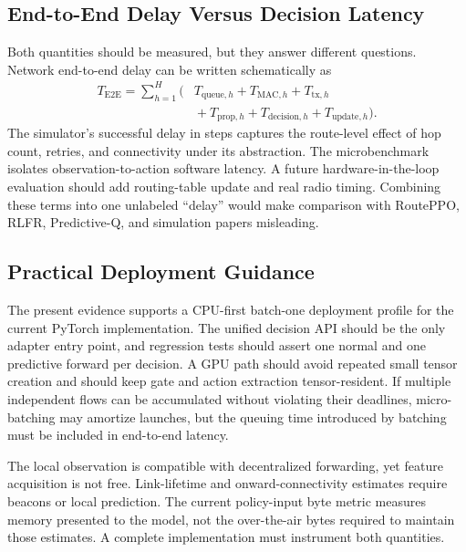 \documentclass{ieeeaccess}
\begin{document}
\subsection{End-to-End Delay Versus Decision Latency}

Both quantities should be measured, but they answer different questions. Network end-to-end delay can be written schematically as
\begin{equation}
\begin{aligned}
T_{\mathrm{E2E}}=\sum_{h=1}^{H}\big(&T_{\mathrm{queue},h}+T_{\mathrm{MAC},h}
+T_{\mathrm{tx},h}\\
&{}+T_{\mathrm{prop},h}+T_{\mathrm{decision},h}
+T_{\mathrm{update},h}\big).
\end{aligned}
\end{equation}
The simulator's successful delay in steps captures the route-level effect of hop count, retries, and connectivity under its abstraction. The microbenchmark isolates observation-to-action software latency. A future hardware-in-the-loop evaluation should add routing-table update and real radio timing. Combining these terms into one unlabeled ``delay'' would make comparison with RoutePPO, RLFR, Predictive-Q, and simulation papers misleading.

\subsection{Practical Deployment Guidance}

The present evidence supports a CPU-first batch-one deployment profile for the current PyTorch implementation. The unified decision API should be the only adapter entry point, and regression tests should assert one normal and one predictive forward per decision. A GPU path should avoid repeated small tensor creation and should keep gate and action extraction tensor-resident. If multiple independent flows can be accumulated without violating their deadlines, micro-batching may amortize launches, but the queuing time introduced by batching must be included in end-to-end latency.

The local observation is compatible with decentralized forwarding, yet feature acquisition is not free. Link-lifetime and onward-connectivity estimates require beacons or local prediction. The current policy-input byte metric measures memory presented to the model, not the over-the-air bytes required to maintain those estimates. A complete implementation must instrument both quantities.
\end{document}
